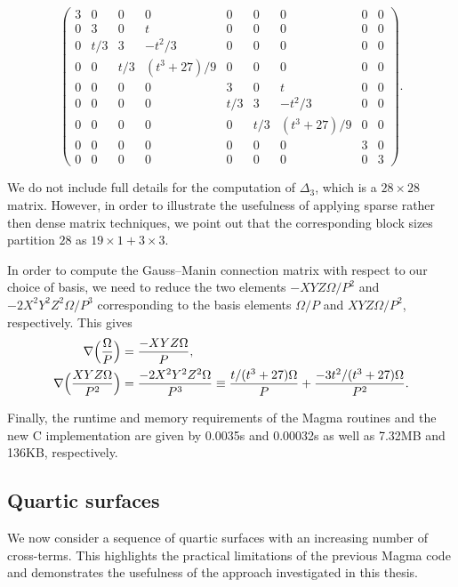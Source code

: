 \begin{equation*}
\renewcommand{\arraystretch}{0.68}
\begin{pmatrix}
3 & 0 & 0 & 0 & 0 & 0 & 0 & 0 & 0 \\
0 & 3 & 0 & t & 0 & 0 & 0 & 0 & 0 \\
0 & t/3 & 3 & -t^2/3 & 0 & 0 & 0 & 0 & 0 \\
0 & 0 & t/3 & (t^3+27)/9 & 0 & 0 & 0 & 0 & 0 \\
0 & 0 & 0 & 0 & 3 & 0 & t & 0 & 0 \\
0 & 0 & 0 & 0 & t/3 & 3 & -t^2/3 & 0 & 0 \\
0 & 0 & 0 & 0 & 0 & t/3 & (t^3+27)/9 & 0 & 0 \\
0 & 0 & 0 & 0 & 0 & 0 & 0 & 3 & 0 \\
0 & 0 & 0 & 0 & 0 & 0 & 0 & 0 & 3
\end{pmatrix}.
\end{equation*}

We do not include full details for the computation of $\Delta_3$, which is a 
$28 \times 28$ matrix.  However, in order to illustrate the usefulness of 
applying sparse rather then dense matrix techniques, we point out that the 
corresponding block sizes partition $28$ as $19 \times 1 + 3 \times 3$.

In order to compute the Gauss--Manin connection matrix with respect to our 
choice of basis, we need to reduce the two elements $- XYZ \Omega / P^2$ and 
$-2 X^2 Y^2 Z^2 \Omega / P^3$ corresponding to the basis elements $\Omega / P$ 
and $XYZ \Omega / P^2$, respectively.  This gives 
\begin{align*}
\nabla \Bigl( \frac{\Omega}{P} \Bigr) & = \frac{- XYZ \Omega}{P}, \\
\nabla \Bigl( \frac{XYZ \Omega}{P^2} \Bigr) & = \frac{-2 X^2 Y^2 Z^2 \Omega}{P^3} \equiv \frac{t/(t^3+27) \Omega}{P} + \frac{-3t^2/(t^3+27) \Omega}{P^2}.
\end{align*}

Finally, the runtime and memory requirements of the {\sc Magma} routines 
and the new C implementation are given by 0.0035s and 0.00032s as well as 
7.32MB and 136KB, respectively.

\subsection{Quartic surfaces}

We now consider a sequence of quartic surfaces with an increasing number of 
cross-terms.  This highlights the practical limitations of the previous 
{\sc Magma} code and demonstrates the usefulness of the approach investigated 
in this thesis.

